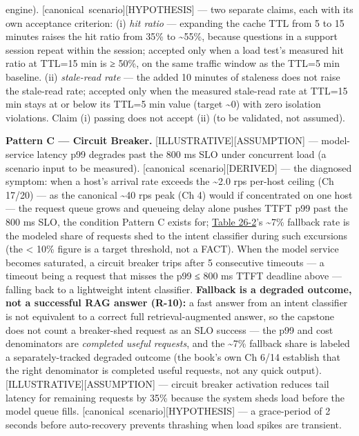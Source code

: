 engine). \mbox{{[}canonical scenario{]}}\hspace{0pt}\mbox{{[}HYPOTHESIS{]}} --- two separate
claims, each with its own acceptance criterion: (i) \emph{hit ratio} ---
expanding the cache TTL from 5 to 15 minutes raises the hit ratio from
35\% to \textasciitilde55\%, because questions in a support session
repeat within the session; accepted only when a load test's measured hit
ratio at TTL=15 min is ≥ 50\%, on the same traffic window as the TTL=5
min baseline. (ii) \emph{stale-read rate} --- the added 10 minutes of
staleness does not raise the stale-read rate; accepted only when the
measured stale-read rate at TTL=15 min stays at or below its TTL=5 min
value (target \textasciitilde0) with zero isolation violations. Claim
(i) passing does not accept (ii) (to be validated, not assumed).

\textbf{Pattern C --- Circuit Breaker.}
\mbox{{[}ILLUSTRATIVE{]}}\hspace{0pt}\mbox{{[}ASSUMPTION{]}} --- model-service latency p99
degrades past the 800 ms SLO under concurrent load (a scenario input to
be measured). \mbox{{[}canonical scenario{]}}\hspace{0pt}\mbox{{[}DERIVED{]}} --- the diagnosed
symptom: when a host's arrival rate exceeds the \textasciitilde2.0 rps
per-host ceiling (Ch 17/20) --- as the canonical \textasciitilde40 rps
peak (Ch 4) would if concentrated on one host --- the request queue
grows and queueing delay alone pushes TTFT p99 past the 800 ms SLO, the
condition Pattern C exists for; \hyperref[tab:26.2]{Table 26-2}'s \textasciitilde7\% fallback
rate is the modeled share of requests shed to the intent classifier
during such excursions (the \textless{} 10\% figure is a target
threshold, not a FACT). When the model service becomes saturated, a
circuit breaker trips after 5 consecutive timeouts --- a timeout being a
request that misses the p99 ≤ 800 ms TTFT deadline above --- falling
back to a lightweight intent classifier. \textbf{Fallback is a degraded
outcome, not a successful RAG answer (R-10):} a fast answer from an
intent classifier is not equivalent to a correct full
retrieval-augmented answer, so the capstone does not count a
breaker-shed request as an SLO success --- the p99 and cost denominators
are \emph{completed useful requests}, and the \textasciitilde7\%
fallback share is labeled a separately-tracked degraded outcome (the
book's own Ch 6/14 establish that the right denominator is completed
useful requests, not any quick output).
\mbox{{[}ILLUSTRATIVE{]}}\hspace{0pt}\mbox{{[}ASSUMPTION{]}} --- circuit breaker activation
reduces tail latency for remaining requests by 35\% because the system
sheds load before the model queue fills. \mbox{{[}canonical
scenario{]}}\hspace{0pt}\mbox{{[}HYPOTHESIS{]}} --- a grace-period of 2 seconds before
auto-recovery prevents thrashing when load spikes are transient.

